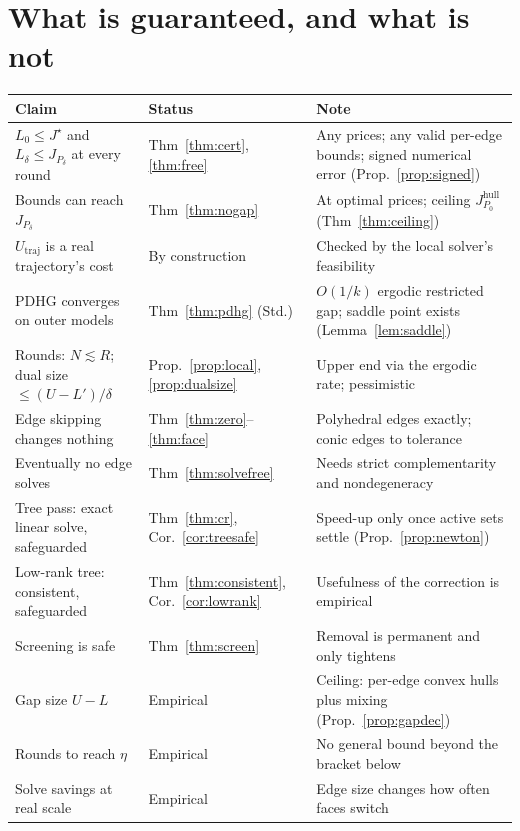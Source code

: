 \documentclass[11pt]{article}
\newcommand{\Jd}{J_{P_\delta}}
\newcommand{\Utraj}{U_{\mathrm{traj}}}
\theoremstyle{plain}
\theoremstyle{definition}
\theoremstyle{remark}
\begin{document}
\section{What is guaranteed, and what is not}
\begin{center}
\small
\begin{tabularx}{\textwidth}{@{}>{\raggedright\arraybackslash}p{5.0cm}>{\raggedright\arraybackslash}p{2.6cm}Y@{}}
\toprule
Claim & Status & Note \\
\midrule
$L_0\le J^\star$ and $L_\delta\le\Jd$ at every round & Thm~\ref{thm:cert}, \ref{thm:free} & Any prices; any valid per-edge bounds; signed numerical error (Prop.~\ref{prop:signed}) \\
Bounds can reach $\Jd$ & Thm~\ref{thm:nogap} & At optimal prices; ceiling $J^{\mathrm{hull}}_{P_0}$ (Thm~\ref{thm:ceiling}) \\
$\Utraj$ is a real trajectory's cost & By construction & Checked by the local solver's feasibility \\
PDHG converges on outer models & Thm~\ref{thm:pdhg} (Std.) & $O(1/k)$ ergodic restricted gap; saddle point exists (Lemma~\ref{lem:saddle}) \\
Rounds: $N\lesssim R$; dual size $\le(U-L')/\delta$ & Prop.~\ref{prop:local}, \ref{prop:dualsize} & Upper end via the ergodic rate; pessimistic \\
Edge skipping changes nothing & Thm~\ref{thm:zero}--\ref{thm:face} & Polyhedral edges exactly; conic edges to tolerance \\
Eventually no edge solves & Thm~\ref{thm:solvefree} & Needs strict complementarity and nondegeneracy \\
Tree pass: exact linear solve, safeguarded & Thm~\ref{thm:cr}, Cor.~\ref{cor:treesafe} & Speed-up only once active sets settle (Prop.~\ref{prop:newton}) \\
Low-rank tree: consistent, safeguarded & Thm~\ref{thm:consistent}, Cor.~\ref{cor:lowrank} & Usefulness of the correction is empirical \\
Screening is safe & Thm~\ref{thm:screen} & Removal is permanent and only tightens \\
Gap size $U-L$ & Empirical & Ceiling: per-edge convex hulls plus mixing (Prop.~\ref{prop:gapdec}) \\
Rounds to reach $\eta$ & Empirical & No general bound beyond the bracket below \\
Solve savings at real scale & Empirical & Edge size changes how often faces switch \\
\bottomrule
\end{tabularx}
\end{center}
\end{document}
